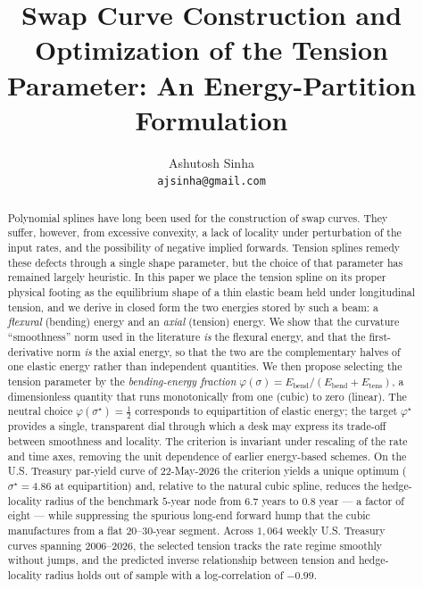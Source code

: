 \documentclass[10pt]{article}
\title{\vspace{-1.2cm}\Large\bfseries Swap Curve Construction and Optimization of the
Tension Parameter: An Energy-Partition Formulation}
\author{Ashutosh Sinha\\
\small\texttt{ajsinha@gmail.com}}
\date{}
\begin{document}
\maketitle
\thispagestyle{fancy}

\begin{abstract}
\noindent Polynomial splines have long been used for the construction of swap curves. They
suffer, however, from excessive convexity, a lack of locality under perturbation of the
input rates, and the possibility of negative implied forwards. Tension splines remedy these
defects through a single shape parameter, but the choice of that parameter has remained
largely heuristic. In this paper we place the tension spline on its proper physical footing
as the equilibrium shape of a thin elastic beam held under longitudinal tension, and we
derive in closed form the two energies stored by such a beam: a \emph{flexural} (bending)
energy and an \emph{axial} (tension) energy. We show that the curvature ``smoothness'' norm
used in the literature \emph{is} the flexural energy, and that the first-derivative norm
\emph{is} the axial energy, so that the two are the complementary halves of one elastic
energy rather than independent quantities. We then propose selecting the tension parameter
by the \emph{bending-energy fraction}
$\varphi(\sigma)=E_{\mathrm{bend}}/(E_{\mathrm{bend}}+E_{\mathrm{tens}})$, a dimensionless
quantity that runs monotonically from one (cubic) to zero (linear). The neutral choice
$\varphi(\sigma^\star)=\tfrac12$ corresponds to equipartition of elastic energy; the target
$\varphi^\star$ provides a single, transparent dial through which a desk may express its
trade-off between smoothness and locality. The criterion is invariant under rescaling of the
rate and time axes, removing the unit dependence of earlier energy-based schemes. On the U.S.
Treasury par-yield curve of $22$-May-$2026$ the criterion yields a unique optimum
($\sigma^\star=4.86$ at equipartition) and, relative to the natural cubic spline, reduces the
hedge-locality radius of the benchmark $5$-year node from $6.7$ years to $0.8$ year --- a
factor of eight --- while suppressing the spurious long-end forward hump that the cubic
manufactures from a flat $20$--$30$-year segment. Across $1{,}064$ weekly U.S. Treasury curves
spanning 2006--2026, the selected tension tracks the rate regime smoothly without jumps, and the
predicted inverse relationship between tension and hedge-locality radius holds out of sample with
a log-correlation of $-0.99$.
\end{abstract}
\end{document}
